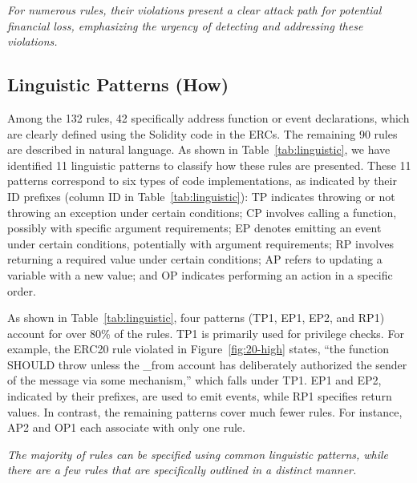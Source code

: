 {\it{
For numerous rules, their violations present a clear attack path 
for potential financial loss, emphasizing the urgency of detecting and 
addressing these violations.
}}







\subsection{Linguistic Patterns (How)}
\label{sec:patterns}

Among the 132 rules, 42 specifically address function or event declarations, 
which are clearly defined using the Solidity code in the ERCs. 
The remaining 90 rules are described in natural language. 
As shown in Table~\ref{tab:linguistic}, we have identified 11 linguistic patterns 
to classify how these rules are presented. 
These 11 patterns correspond to six types of code implementations, 
as indicated by their ID prefixes (column ID in Table~\ref{tab:linguistic}): 
TP indicates throwing or not throwing an exception under certain conditions; 
CP involves calling a function, possibly with specific argument requirements; 
EP denotes emitting an event under certain conditions, 
potentially with argument requirements; 
RP involves returning a required value under certain conditions; 
AP refers to updating a variable with a new value; 
and OP indicates performing an action in a specific order.

As shown in Table~\ref{tab:linguistic}, 
four patterns (TP1, EP1, EP2, and RP1) account for over 80\% of the rules. 
TP1 is primarily used for privilege checks. For example, the ERC20 rule violated 
in Figure~\ref{fig:20-high} states, ``the function SHOULD throw unless the \_from account 
has deliberately authorized the sender of the message via some mechanism,''
which falls under TP1. 
EP1 and EP2, indicated by their prefixes, are used to emit events, 
while RP1 specifies return values. In contrast, the remaining patterns 
cover much fewer rules. For instance, 
AP2 and OP1 each associate with only one rule.



{\it{
The majority of rules can be specified using common linguistic patterns, while 
there are a few rules that are specifically outlined in a distinct manner.
}}

